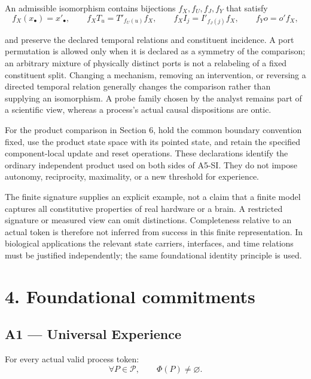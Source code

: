 \documentclass[
  11pt,
  a4paper,
]{article}
\begin{document}
An admissible isomorphism contains bijections \(f_X,f_U,f_J,f_Y\) that
satisfy
\nopagebreak[4]
\[
f_X(x_\bullet)=x'_\bullet,\qquad
f_XT_u=T'_{f_U(u)}f_X,\qquad
f_XI_j=I'_{f_J(j)}f_X,\qquad
f_Yo=o'f_X,
\]

and preserve the declared temporal relations and constituent incidence.
A port permutation is allowed only when it is declared as a symmetry of
the comparison; an arbitrary mixture of physically distinct ports is not
a relabeling of a fixed constituent split. Changing a mechanism,
removing an intervention, or reversing a directed temporal relation
generally changes the comparison rather than supplying an isomorphism. A
probe family chosen by the analyst remains part of a scientific view,
whereas a process's actual causal dispositions are ontic.

For the product comparison in Section 6, hold the common boundary
convention fixed, use the product state space with its pointed state,
and retain the specified component-local update and reset operations.
These declarations identify the ordinary independent product used on
both sides of A5-SI. They do not impose autonomy, reciprocity,
maximality, or a new threshold for experience.

The finite signature supplies an explicit example, not a claim that a
finite model captures all constitutive properties of real hardware or a
brain. A restricted signature or measured view can omit distinctions.
Completeness relative to an actual token is therefore not inferred from
success in this finite representation. In biological applications the
relevant state carriers, interfaces, and time relations must be
justified independently; the same foundational identity principle is
used.

\hypertarget{foundational-commitments}{%
\section{4. Foundational commitments}\label{foundational-commitments}}

\hypertarget{a1-universal-experience}{%
\subsection{A1 --- Universal Experience}\label{a1-universal-experience}}

For every actual valid process token:
\nopagebreak[4]
\[
\boxed{
\forall P\in\mathcal P,
\qquad
\Phi(P)\neq\varnothing.
}
\]
\end{document}

